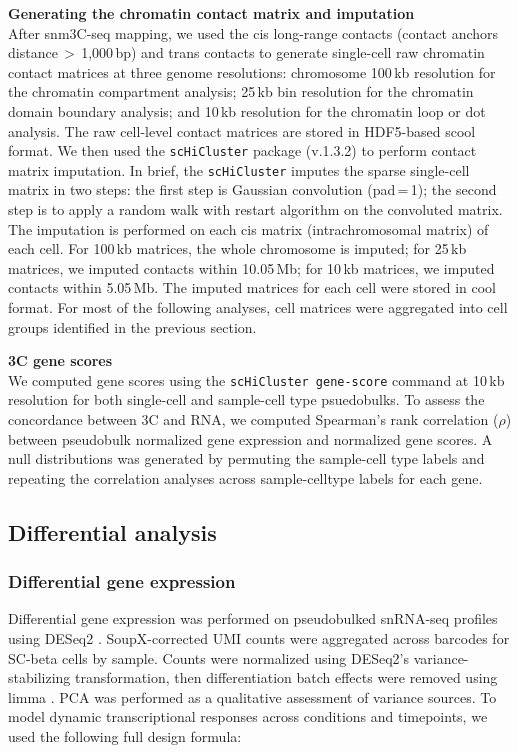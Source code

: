 \textbf{Generating the chromatin contact matrix and imputation} \\
After snm3C-seq mapping, we used the cis long-range contacts (contact anchors distance\,$>$\,1{,}000\,bp) and trans contacts to generate single-cell raw chromatin contact matrices at three genome resolutions: chromosome 100\,kb resolution for the chromatin compartment analysis; 25\,kb bin resolution for the chromatin domain boundary analysis; and 10\,kb resolution for the chromatin loop or dot analysis. The raw cell-level contact matrices are stored in HDF5-based scool format. We then used the \texttt{scHiCluster} \cite{Zhou2019-vd} package (v.1.3.2) to perform contact matrix imputation. In brief, the \texttt{scHiCluster} imputes the sparse single-cell matrix in two steps: the first step is Gaussian convolution (pad\,=\,1); the second step is to apply a random walk with restart algorithm on the convoluted matrix. The imputation is performed on each cis matrix (intrachromosomal matrix) of each cell. For 100\,kb matrices, the whole chromosome is imputed; for 25\,kb matrices, we imputed contacts within 10.05\,Mb; for 10\,kb matrices, we imputed contacts within 5.05\,Mb. The imputed matrices for each cell were stored in cool format. For most of the following analyses, cell matrices were aggregated into cell groups identified in the previous section.

\textbf{3C gene scores} \\
We computed gene scores using the \texttt{scHiCluster gene-score} command at 10\,kb resolution for both single-cell and sample-cell type psuedobulks. To assess the concordance between 3C and RNA, we computed Spearman’s rank correlation ($\rho$) between pseudobulk normalized gene expression and normalized gene scores. A null distributions was generated by permuting the sample-cell type labels and repeating the correlation analyses across sample-celltype labels for each gene.

\subsection{Differential analysis}

\subsubsection{Differential gene expression}

Differential gene expression was performed on pseudobulked snRNA-seq profiles using DESeq2 \cite{Love2014-rn}. SoupX-corrected UMI counts were aggregated across barcodes for SC-beta cells by sample. Counts were normalized using DESeq2’s variance-stabilizing transformation, then differentiation batch effects were removed using limma \cite{Ritchie2015-ec}. PCA was performed as a qualitative assessment of variance sources. To model dynamic transcriptional responses across conditions and timepoints, we used the following full design formula:

